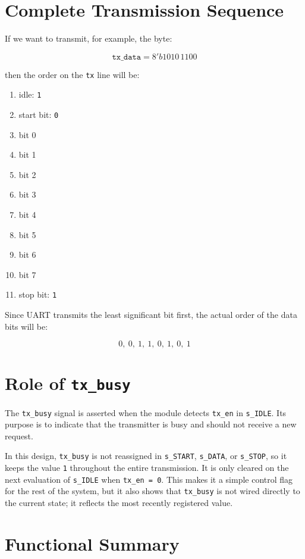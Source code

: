 \documentclass[12pt]{article}
\begin{document}
\section{Complete Transmission Sequence}

If we want to transmit, for example, the byte:

\[
\texttt{tx\_data} = 8'b1010\,1100
\]

then the order on the \texttt{tx} line will be:

\begin{enumerate}
    \item idle: \texttt{1}
    \item start bit: \texttt{0}
    \item bit 0
    \item bit 1
    \item bit 2
    \item bit 3
    \item bit 4
    \item bit 5
    \item bit 6
    \item bit 7
    \item stop bit: \texttt{1}
\end{enumerate}

Since UART transmits the least significant bit first, the actual order of the data bits will be:

\[
0,\ 0,\ 1,\ 1,\ 0,\ 1,\ 0,\ 1
\]

\section{Role of \texttt{tx\_busy}}

The \texttt{tx\_busy} signal is asserted when the module detects \texttt{tx\_en} in \texttt{s\_IDLE}. Its purpose is to indicate that the transmitter is busy and should not receive a new request.

In this design, \texttt{tx\_busy} is not reassigned in \texttt{s\_START}, \texttt{s\_DATA}, or \texttt{s\_STOP}, so it keeps the value \texttt{1} throughout the entire transmission. It is only cleared on the next evaluation of \texttt{s\_IDLE} when \texttt{tx\_en = 0}. This makes it a simple control flag for the rest of the system, but it also shows that \texttt{tx\_busy} is not wired directly to the current state; it reflects the most recently registered value.

\section{Functional Summary}
\end{document}
